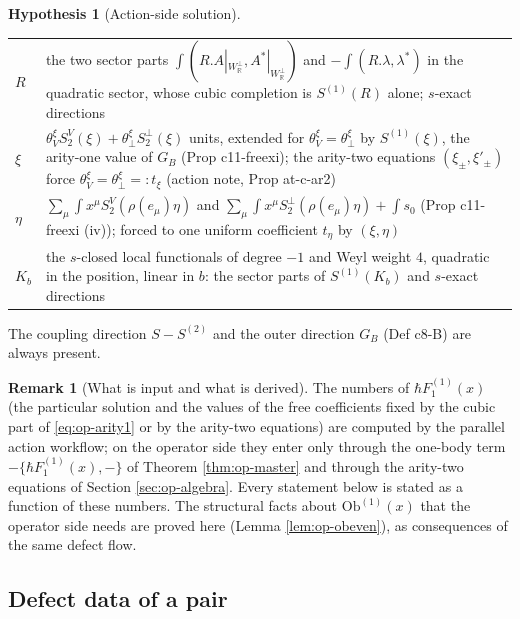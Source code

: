 \documentclass[11pt]{article}
\numberwithin{equation}{section}
\theoremstyle{plain}
\theoremstyle{definition}
\newtheorem{hypothesis}[theorem]{Hypothesis}
\newtheorem{remark}[theorem]{Remark}
\newcommand{\Ap}{A|_{W_{\mathbb R}^\perp}}
\begin{document}
\begin{hypothesis}[Action-side solution]
\begin{center}
\begin{tabular}{l|p{11.2cm}}
$R$ & the two sector parts $\int(R.\Ap,A^*|_{W_{\mathbb R}^\perp})$ and $-\int(R.\lambda,\lambda^*)$ in the quadratic sector, whose cubic completion is $S^{(1)}(R)$ alone; $s$-exact directions\\
$\xi$ & $\theta^\xi_V S^V_2(\xi)+\theta^\xi_\perp S^\perp_2(\xi)$ units, extended for $\theta^\xi_V=\theta^\xi_\perp$ by $S^{(1)}(\xi)$, the arity-one value of $G_B$ (Prop c11-freexi); the arity-two equations $(\xi_\pm,\xi'_\pm)$ force $\theta^\xi_V=\theta^\xi_\perp=:t_\xi$ (action note, Prop at-c-ar2)\\
$\eta$ & $\sum_\mu\int x^\mu S^V_2(\rho(e_\mu)\eta)$ and $\sum_\mu\int x^\mu S^\perp_2(\rho(e_\mu)\eta)+\int s_0$ (Prop c11-freexi (iv)); forced to one uniform coefficient $t_\eta$ by $(\xi,\eta)$\\
$K_b$ & the $s$-closed local functionals of degree $-1$ and Weyl weight $4$, quadratic in the position, linear in $b$: the sector parts of $S^{(1)}(K_b)$ and $s$-exact directions
\end{tabular}
\end{center}
The coupling direction $S-S^{(2)}$ and the outer direction $G_B$ (Def c8-B) are always present.
\end{hypothesis}

\begin{remark}[What is input and what is derived]
\label{rem:op-input}
The numbers of $\hbar F_1^{(1)}(x)$ (the particular solution and the values of the free coefficients fixed by the cubic part of \eqref{eq:op-arity1} or by the arity-two equations) are computed by the parallel action workflow; on the operator side they enter only through the one-body term $-\{\hbar F_1^{(1)}(x),-\}$ of Theorem \ref{thm:op-master} and through the arity-two equations of Section \ref{sec:op-algebra}. Every statement below is stated as a function of these numbers. The structural facts about $\mathrm{Ob}^{(1)}(x)$ that the operator side needs are proved here (Lemma \ref{lem:op-obeven}), as consequences of the same defect flow.
\end{remark}

\subsection{Defect data of a pair}
\end{document}
